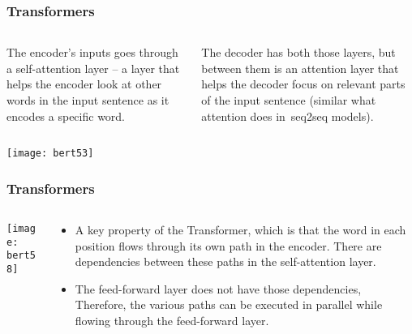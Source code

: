 \begin{frame}[fragile]\frametitle{Transformers}
\begin{columns}
    \begin{column}[T]{0.5\linewidth}
     The encoder’s inputs goes through a self-attention layer – a layer that helps the encoder look at other words in the input sentence as it encodes a specific word.  
		\end{column}
    \begin{column}[T]{0.5\linewidth}
		The decoder has both those layers, but between them is an attention layer that helps the decoder focus on relevant parts of the input sentence (similar what attention does in seq2seq models).
    \end{column}
  \end{columns}
	
			\begin{center}
			\texttt{[image: bert53]}
			\end{center}
			
\end{frame}

\begin{frame}[fragile]\frametitle{Transformers}
\begin{columns}
    \begin{column}[T]{0.5\linewidth}
			\begin{center}
			\texttt{[image: bert58]}
			\end{center}		
		\end{column}
    \begin{column}[T]{0.5\linewidth}
      \begin{itemize}
			\item A key property of the Transformer, which is that the word in each position flows through its own path in the encoder. There are dependencies between these paths in the self-attention layer. 
			\item The feed-forward layer does not have those dependencies, Therefore, the various paths can be executed in parallel while flowing through the feed-forward layer.
			\end{itemize}
    \end{column}
  \end{columns}
			
\end{frame}

